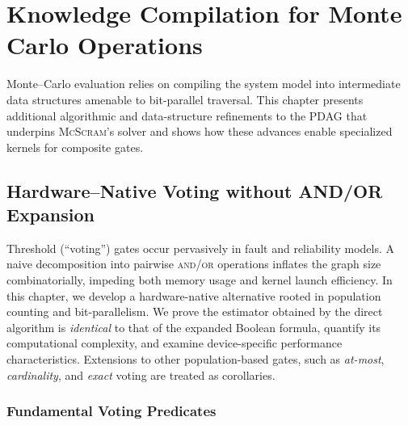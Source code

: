 \chapter{Knowledge Compilation for Monte Carlo Operations}
\label{chap:kc}

Monte–Carlo evaluation relies on compiling the system model into intermediate data structures amenable to bit-parallel traversal. This chapter presents additional algorithmic and data-structure refinements to the PDAG that underpins \textsc{McScram}'s solver and shows how these advances enable specialized kernels for composite gates.

\section{Hardware--Native Voting without AND/OR Expansion}
\label{sec:voter}\label{chap:voter}

Threshold (``voting'') gates occur pervasively in fault
and reliability models.  A naive decomposition into pairwise \textsc{and}/\textsc{or}
operations inflates the graph size combinatorially, impeding both memory usage
and kernel launch efficiency.  In this chapter, we develop a hardware-native alternative
rooted in population counting and bit-parallelism. We prove the estimator obtained 
by the direct algorithm is \emph{identical} to
that of the expanded Boolean formula, quantify its computational complexity,
and examine device-specific performance characteristics.  Extensions to other population-based gates, such as \emph{at-most}, \emph{cardinality}, and \emph{exact} voting are treated as corollaries.

\subsection{Fundamental Voting Predicates}
\label{sec:voter_predicates}

